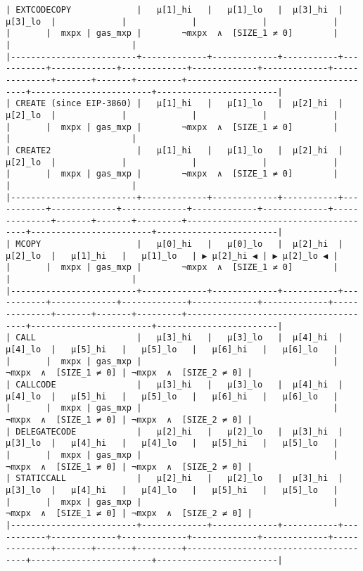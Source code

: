 \documentclass[varwidth=\maxdimen,margin=0.5cm,multi={verbatim}]{standalone}
\begin{document}
\begin{verbatim}
| EXTCODECOPY             |   μ[1]_hi   |   μ[1]_lo   |  μ[3]_hi  |  μ[3]_lo  |             |             |             |             |              |       |  mxpx | gas_mxp |        ¬mxpx  ∧  [SIZE_1 ≠ 0]        |                        |                        |
|-------------------------+-------------+-------------+-----------+-----------+-------------+-------------+-------------+-------------+--------------+-------+-------+---------+--------------------------------------+------------------------+------------------------|
| CREATE (since EIP-3860) |   μ[1]_hi   |   μ[1]_lo   |  μ[2]_hi  |  μ[2]_lo  |             |             |             |             |              |       |  mxpx | gas_mxp |        ¬mxpx  ∧  [SIZE_1 ≠ 0]        |                        |                        |
| CREATE2                 |   μ[1]_hi   |   μ[1]_lo   |  μ[2]_hi  |  μ[2]_lo  |             |             |             |             |              |       |  mxpx | gas_mxp |        ¬mxpx  ∧  [SIZE_1 ≠ 0]        |                        |                        |
|-------------------------+-------------+-------------+-----------+-----------+-------------+-------------+-------------+-------------+--------------+-------+-------+---------+--------------------------------------+------------------------+------------------------|
| MCOPY                   |   μ[0]_hi   |   μ[0]_lo   |  μ[2]_hi  |  μ[2]_lo  |   μ[1]_hi   |   μ[1]_lo   | ▶ μ[2]_hi ◀ | ▶ μ[2]_lo ◀ |              |       |  mxpx | gas_mxp |        ¬mxpx  ∧  [SIZE_1 ≠ 0]        |                        |                        |
|-------------------------+-------------+-------------+-----------+-----------+-------------+-------------+-------------+-------------+--------------+-------+-------+---------+--------------------------------------+------------------------+------------------------|
| CALL                    |   μ[3]_hi   |   μ[3]_lo   |  μ[4]_hi  |  μ[4]_lo  |   μ[5]_hi   |   μ[5]_lo   |   μ[6]_hi   |   μ[6]_lo   |              |       |  mxpx | gas_mxp |                                      | ¬mxpx  ∧  [SIZE_1 ≠ 0] | ¬mxpx  ∧  [SIZE_2 ≠ 0] |
| CALLCODE                |   μ[3]_hi   |   μ[3]_lo   |  μ[4]_hi  |  μ[4]_lo  |   μ[5]_hi   |   μ[5]_lo   |   μ[6]_hi   |   μ[6]_lo   |              |       |  mxpx | gas_mxp |                                      | ¬mxpx  ∧  [SIZE_1 ≠ 0] | ¬mxpx  ∧  [SIZE_2 ≠ 0] |
| DELEGATECODE            |   μ[2]_hi   |   μ[2]_lo   |  μ[3]_hi  |  μ[3]_lo  |   μ[4]_hi   |   μ[4]_lo   |   μ[5]_hi   |   μ[5]_lo   |              |       |  mxpx | gas_mxp |                                      | ¬mxpx  ∧  [SIZE_1 ≠ 0] | ¬mxpx  ∧  [SIZE_2 ≠ 0] |
| STATICCALL              |   μ[2]_hi   |   μ[2]_lo   |  μ[3]_hi  |  μ[3]_lo  |   μ[4]_hi   |   μ[4]_lo   |   μ[5]_hi   |   μ[5]_lo   |              |       |  mxpx | gas_mxp |                                      | ¬mxpx  ∧  [SIZE_1 ≠ 0] | ¬mxpx  ∧  [SIZE_2 ≠ 0] |
|-------------------------+-------------+-------------+-----------+-----------+-------------+-------------+-------------+-------------+--------------+-------+-------+---------+--------------------------------------+------------------------+------------------------|



\end{verbatim}
\end{document}
